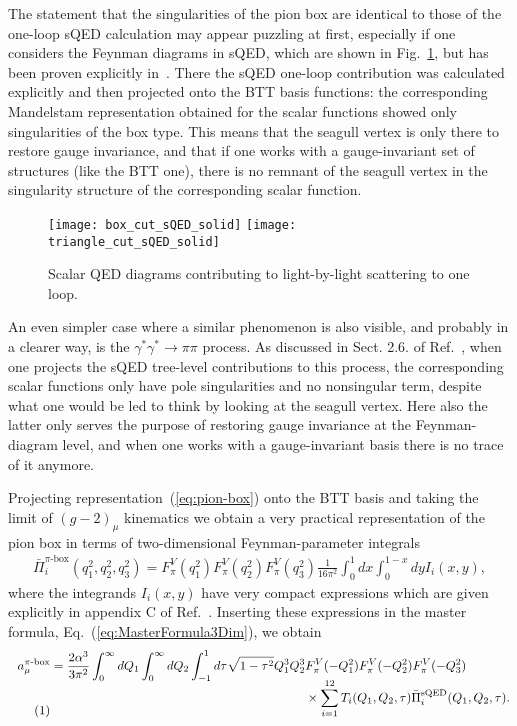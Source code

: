 \documentclass[epj]{webofc}
\newcommand{\<}{\langle}
\renewcommand{\>}{\rangle}
\newcommand{\mytag}{\\[-\baselineskip] \stepcounter{equation}\tag{\theequation}}
\begin{document}
The statement that the singularities of the pion box are identical to those
of the one-loop sQED calculation may appear puzzling at first, especially
if one considers the Feynman diagrams in sQED, which are shown in
Fig.~\ref{fig:sQED}, but has been proven explicitly
in~\cite{Colangelo:2015ama}. There the sQED one-loop contribution was
calculated explicitly and then projected onto the BTT basis functions: the
corresponding Mandelstam representation obtained for the scalar functions
showed only singularities of the box type. This means that the seagull
vertex is only there to restore gauge invariance, and that if one works
with a gauge-invariant set of structures (like the BTT one), there is no
remnant of the seagull vertex in the singularity structure of the
corresponding scalar function. 
\begin{figure}
\centering
\texttt{[image: box\_cut\_sQED\_solid]} \quad
\texttt{[image: triangle\_cut\_sQED\_solid]}  \quad
{}
\caption{Scalar QED diagrams contributing to light-by-light scattering to
  one loop.}
\label{fig:sQED}
\end{figure}
An even simpler case where a similar phenomenon is also visible, and
probably in a clearer way, is the
$\gamma^* \gamma^* \to \pi \pi$ process. As discussed in Sect. 2.6. of
Ref.~\cite{Colangelo:2015ama}, when one projects the sQED tree-level
contributions to this process, the corresponding scalar functions only have
pole singularities and no nonsingular term, despite what one would be led
to think by looking at the seagull vertex. Here also the latter only serves
the purpose of restoring gauge invariance at the Feynman-diagram level, and
when one works with a gauge-invariant basis there is no trace of it anymore.

Projecting representation~(\ref{eq:pion-box}) onto the BTT basis and taking
the limit of $(g-2)_\mu$ kinematics we obtain
a very practical representation of the pion box in terms of two-dimensional
Feynman-parameter integrals
\begin{align}
	\bar \Pi_i^{\pi\text{-box}}(q_1^2,q_2^2,q_3^2) = F_\pi^V(q_1^2) F_\pi^V(q_2^2) F_\pi^V(q_3^2) \frac{1}{16\pi^2} \int_0^1 dx \int_0^{1-x} dy  I_i(x,y) ,
\end{align}
where the integrands $I_i(x,y)$ have very compact expressions which are
given explicitly in appendix C of Ref.~\cite{Colangelo:2017fiz}. Inserting
these expressions in the master formula, Eq.~(\ref{eq:MasterFormula3Dim}),
we obtain
\begin{align*}
		a_\mu^{\pi\text{-box}}&= \frac{2 \alpha^3}{3 \pi^2} \int_0^\infty dQ_1 \int_0^\infty dQ_2 \int_{-1}^1 d\tau \sqrt{1-\tau^2} Q_1^3 Q_2^3 \begin{aligned}[t]
			& F_\pi^V(-Q_1^2) F_\pi^V(-Q_2^2) F_\pi^V(-Q_3^2) \\
			& \times \sum_{i=1}^{12} T_i(Q_1,Q_2,\tau) \bar \Pi_i^\mathrm{sQED}(Q_1,Q_2,\tau) . \end{aligned} \mytag
\end{align*}
\end{document}
